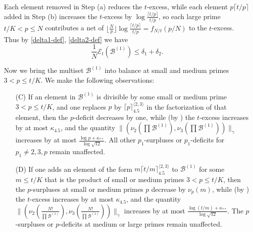 \documentclass[12pt,a4paper,reqno]{amsart}
\numberwithin{equation}{section}
\theoremstyle{plain}
\theoremstyle{definition}
\newcommand\tuple{{\mathcal B}}
\newcommand\excess{{\mathcal{E}}}
\begin{document}
Each element removed in Step (a) reduces the $t$-excess, while each element $p \lceil t/p \rceil$ added in Step (b) increases the $t$-excess by $\log \frac{\lceil t/p \rceil}{t/p}$, so each large prime $t/K < p \leq N$ contributes a net of $\lfloor \frac{N}{p} \rfloor \log \frac{\lceil t/p \rceil}{t/p} = f_{N/t}(p/N)$ to the $t$-excess.  Thus by \eqref{delta1-def}, \eqref{delta2-def} we have
\begin{equation}\label{excess-1} 
  \frac{1}{N} \excess_t(\tuple^{(1)}) \leq \delta_1 + \delta_2.
\end{equation}

Now we bring the multiset $\tuple^{(1)}$ into balance at small and medium primes $3 < p \leq t/K$.  We make the following observations:
\begin{itemize}
\item[(C)]  If an element in $\tuple^{(1)}$ is divisible by some small or medium prime $3 < p \leq t/K$, and one replaces $p$ by $\lceil p \rceil^{\langle 2,3 \rangle}_{4.5}$ in the factorization of that element, then the $p$-deficit decreases by one, while (by ) the $t$-excess increases by at most $\kappa_{4.5}$, and the quantity $\| (\nu_2(\prod \tuple^{(1)}),\nu_3(\prod \tuple^{(1)}))\|_\gamma$ increases by at most $\frac{\log p + \kappa_{**}}{\log \sqrt{12}}$.  All other $p_1$-surpluses or $p_1$-deficits for $p_1 \neq 2,3,p$ remain unaffected.
\item[(D)]  If one adds an element of the form $m \lceil t/m \rceil^{\langle 2,3 \rangle}_{4.5}$ to $\tuple^{(1)}$ for some $m \leq t/K$ that is the product of small or medium primes $3 < p \leq t/K$, then the $p$-surpluses at small or medium primes $p$ decrease by $\nu_p(m)$, while (by ) the $t$-excess increases by at most $\kappa_{4.5}$, and the quantity $\| (\nu_2(\frac{N!}{\prod \tuple^{(1)}}), \nu_3(\frac{N!}{\prod \tuple^{(1)}}))\|_\gamma$ increases by at most $\frac{\log(t/m) + \kappa_{**}}{\log \sqrt{12}}$.  The $p$-surpluses or $p$-deficits at medium or large primes remain unaffected.
\end{itemize}
\end{document}

